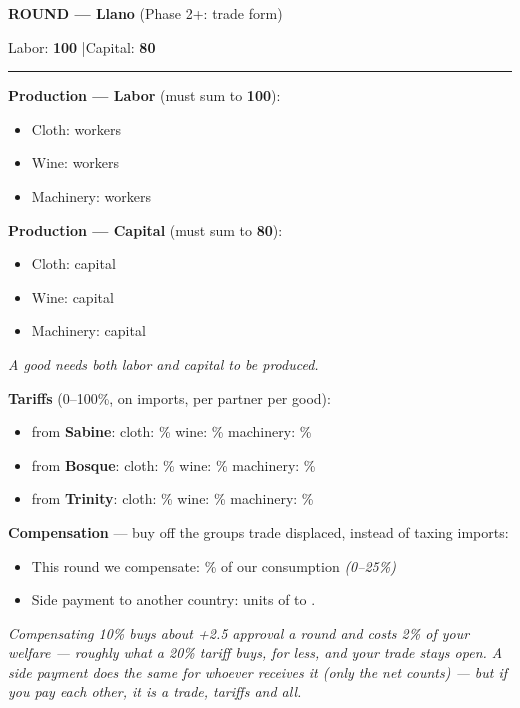 \documentclass[11pt]{article}
\newcommand{\blank}[1]{\underline{\hspace{#1}}}
\newcommand{\hr}{\par\vspace{2pt}\noindent\rule{\linewidth}{0.4pt}\par\vspace{2pt}}
\begin{document}
\newpage

{\large\bfseries ROUND \blank{1cm} --- Llano} \hfill (Phase 2+: trade form)\par
Labor: \textbf{100} \quad|\quad Capital: \textbf{80}
\hr

{\bfseries Production --- Labor} (must sum to \textbf{100}):\par
\begin{itemize}[nosep,leftmargin=1.4em]
  \item Cloth: \blank{2.5cm} workers
  \item Wine: \blank{2.5cm} workers
  \item Machinery: \blank{2.5cm} workers
\end{itemize}

{\bfseries Production --- Capital} (must sum to \textbf{80}):\par
\begin{itemize}[nosep,leftmargin=1.4em]
  \item Cloth: \blank{2.5cm} capital
  \item Wine: \blank{2.5cm} capital
  \item Machinery: \blank{2.5cm} capital
\end{itemize}
\textit{A good needs \emph{both} labor and capital to be produced.}

\vspace{4pt}
{\bfseries Tariffs} (0--100\%, on imports, per partner per good):\par
\begin{itemize}[nosep,leftmargin=1.4em]
  \item from \textbf{Sabine}: \quad cloth: \blank{1.4cm}\% \quad wine: \blank{1.4cm}\% \quad machinery: \blank{1.4cm}\%
  \item from \textbf{Bosque}: \quad cloth: \blank{1.4cm}\% \quad wine: \blank{1.4cm}\% \quad machinery: \blank{1.4cm}\%
  \item from \textbf{Trinity}: \quad cloth: \blank{1.4cm}\% \quad wine: \blank{1.4cm}\% \quad machinery: \blank{1.4cm}\%
\end{itemize}

\vspace{4pt}
{\bfseries Compensation} --- buy off the groups trade displaced, instead of taxing imports:\par
\begin{itemize}[nosep,leftmargin=1.4em]
  \item This round we compensate: \blank{1.4cm}\% of our consumption \quad \textit{(0--25\%)}
  \item Side payment to another country: \blank{1.6cm} units of \blank{2cm} to \blank{2.2cm}.
\end{itemize}
\textit{Compensating 10\% buys about +2.5 approval a round and costs 2\% of your welfare --- roughly what a 20\% tariff buys, for less, and your trade stays open. A side payment does the same for whoever receives it (only the net counts) --- but if you pay each other, it is a trade, tariffs and all.}
\end{document}
